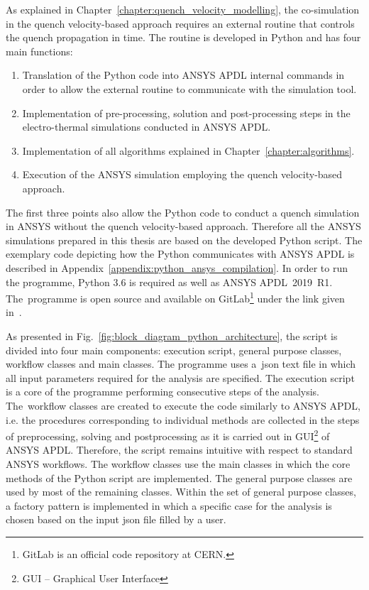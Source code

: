
As explained in Chapter~\ref{chapter:quench_velocity_modelling}, the co-simulation in the quench velocity-based approach requires an external routine that controls the quench propagation in time. The routine is developed in Python and has four main functions: 

\begin{enumerate}
    \item Translation of the Python code into ANSYS APDL internal commands in order to allow the external routine to communicate with the simulation tool. 
    \item Implementation of pre-processing, solution and post-processing steps in the electro-thermal simulations conducted in ANSYS APDL.
    \item Implementation of all algorithms explained in Chapter~\ref{chapter:algorithms}.
    \item Execution of the ANSYS simulation employing the quench velocity-based approach. 
\end{enumerate}

The first three points also allow the Python code to conduct a quench simulation in ANSYS without the quench velocity-based approach. Therefore all the ANSYS simulations prepared in this thesis are based on the developed Python script. The exemplary code depicting how the Python communicates with ANSYS APDL is described in Appendix~\ref{appendix:python_ansys_compilation}. In order to run the programme, Python 3.6 is required as well as ANSYS APDL~2019~R1. The~programme is open source and available on GitLab\footnote{GitLab is an official code repository at CERN.} under the link given in~\cite{my_python_code}.

As presented in Fig.~\ref{fig:block_diagram_python_architecture}, the script is divided into four main components: execution script, general purpose classes, workflow classes and main classes. The programme uses a~json text file in which all input parameters required for the analysis are specified. The execution script is a core of the programme performing consecutive steps of the analysis. The~workflow classes are created to execute the code similarly to ANSYS APDL, i.e. the procedures corresponding to individual methods are collected in the steps of preprocessing, solving and postprocessing as it is carried out in GUI\footnote{GUI -- Graphical User Interface} of ANSYS APDL. Therefore, the script remains intuitive with respect to standard ANSYS workflows. The workflow classes use the main classes in which the core methods of the Python script are implemented. The general purpose classes are used by most of the remaining classes. Within the set of general purpose classes, a factory pattern is implemented in which a specific case for the analysis is chosen based on the input json file filled by a user.

